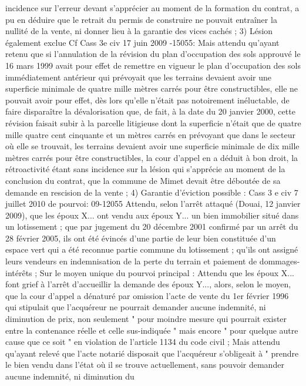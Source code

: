 \documentclass[11pt,a4paper]{report}
\begin{document}
	incidence sur l'erreur devant s'apprécier au moment de la formation du contrat, a pu en déduire que le
	retrait du permis de construire ne pouvait entraîner la nullité de la vente, ni donner lieu à la garantie des
	vices cachés ;
	3) Lésion également exclue
	Cf Cass 3e civ 17 juin 2009 -15055:
	Mais attendu qu'ayant retenu que si l'annulation de la révision du plan d'occupation des sols approuvé
	le 16 mars 1999 avait pour effet de remettre en vigueur le plan d'occupation des sols immédiatement
	antérieur qui prévoyait que les terrains devaient avoir une superficie minimale de quatre mille mètres
	carrés pour être constructibles, elle ne pouvait avoir pour effet, dès lors qu'elle n'était pas notoirement
	inéluctable, de faire disparaître la dévalorisation que, de fait, à la date du 20 janvier 2000, cette révision
	faisait subir à la parcelle litigieuse dont la superficie n'était que de quatre mille quatre cent cinquante et un
	mètres carrés en prévoyant que dans le secteur où elle se trouvait, les terrains devaient avoir une superficie
	minimale de dix mille mètres carrés pour être constructibles, la cour d'appel en a déduit à bon droit, la
	rétroactivité étant sans incidence sur la lésion qui s'apprécie au moment de la conclusion du contrat, que la
	commune de Mimet devait être déboutée de sa demande en rescision de la vente ;
	4) Garantie d’éviction possible : Cass 3 e civ 7 juillet 2010 \No  de pourvoi: 09-12055
	Attendu, selon l'arrêt attaqué (Douai, 12 janvier 2009), que les époux X... ont vendu aux époux Y... un
	bien immobilier situé dans un lotissement ; que par jugement du 20 décembre 2001 confirmé par un arrêt du
	28 février 2005, ils ont été évincés d'une partie de leur bien constituée d'un espace vert qui a été reconnue
	partie commune du lotissement ; qu'ils ont assigné leurs vendeurs en indemnisation de la perte du terrain et
	paiement de dommages-intérêts ;
	Sur le moyen unique du pourvoi principal :
	Attendu que les époux X... font grief à l'arrêt d'accueillir la demande des époux Y..., alors, selon le moyen,
	que la cour d'appel a dénaturé par omission l'acte de vente du 1er février 1996 qui stipulait que l'acquéreur
	ne pourrait demander aucune indemnité, ni diminution de prix, non seulement " pour moindre mesure qui
	pourrait exister entre la contenance réelle et celle sus-indiquée " mais encore " pour quelque autre cause
	que ce soit " en violation de l'article 1134 du code civil ;
	Mais attendu qu'ayant relevé que l'acte notarié disposait que l'acquéreur s'obligeait à " prendre le bien
	vendu dans l'état où il se trouve actuellement, sans pouvoir demander aucune indemnité, ni diminution du
\end{document}

